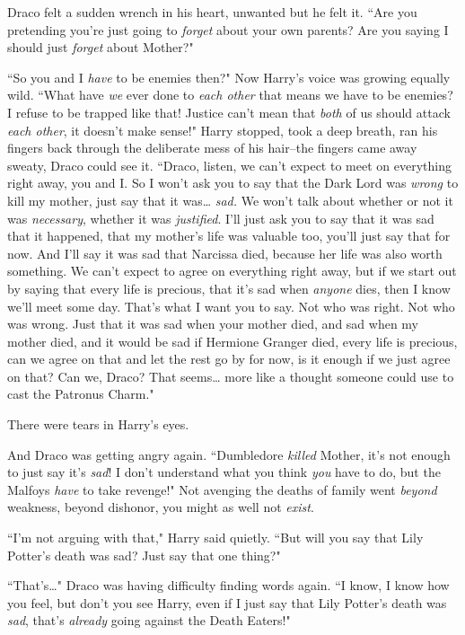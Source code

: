 Draco felt a sudden wrench in his heart, unwanted but he felt it. ``Are you pretending you're just going to \emph{forget} about your own parents? Are you saying I should just \emph{forget} about Mother?"

``So you and I \emph{have} to be enemies then?" Now Harry's voice was growing equally wild. ``What have \emph{we} ever done to \emph{each other} that means we have to be enemies? I refuse to be trapped like that! Justice can't mean that \emph{both} of us should attack \emph{each other}, it doesn't make sense!" Harry stopped, took a deep breath, ran his fingers back through the deliberate mess of his hair\---the fingers came away sweaty, Draco could see it. ``Draco, listen, we can't expect to meet on everything right away, you and I\@. So I won't ask you to say that the Dark Lord was \emph{wrong} to kill my mother, just say that it was{\ldots} \emph{sad.} We won't talk about whether or not it was \emph{necessary}, whether it was \emph{justified}. I'll just ask you to say that it was sad that it happened, that my mother's life was valuable too, you'll just say that for now. And I'll say it was sad that Narcissa died, because her life was also worth something. We can't expect to agree on everything right away, but if we start out by saying that every life is precious, that it's sad when \emph{anyone} dies, then I know we'll meet some day. That's what I want you to say. Not who was right. Not who was wrong. Just that it was sad when your mother died, and sad when my mother died, and it would be sad if Hermione Granger died, every life is precious, can we agree on that and let the rest go by for now, is it enough if we just agree on that? Can we, Draco? That seems{\ldots} more like a thought someone could use to cast the Patronus Charm."

There were tears in Harry's eyes.

And Draco was getting angry again. ``Dumbledore \emph{killed} Mother, it's not enough to just say it's \emph{sad}! I don't understand what you think \emph{you} have to do, but the Malfoys \emph{have} to take revenge!" Not avenging the deaths of family went \emph{beyond} weakness, beyond dishonor, you might as well not \emph{exist}.

``I'm not arguing with that," Harry said quietly. ``But will you say that Lily Potter's death was sad? Just say that one thing?"

``That's{\ldots}" Draco was having difficulty finding words again. ``I know, I know how you feel, but don't you see Harry, even if I just say that Lily Potter's death was \emph{sad}, that's \emph{already} going against the Death Eaters!"

